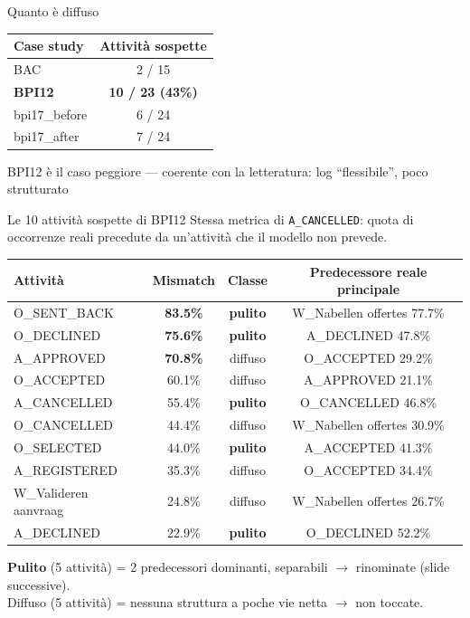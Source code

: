 \documentclass[11pt,aspectratio=169]{beamer}
\newcommand{\good}[1]{\textcolor{goodcol}{\textbf{#1}}}
\newcommand{\warncell}[1]{\textcolor{warncol}{\textbf{#1}}}
\begin{document}
\begin{frame}{Quanto \`e diffuso}
\begin{center}
\begin{tabular}{lc}
\toprule
\textbf{Case study} & \textbf{Attivit\`a sospette} \\
\midrule
BAC & 2 / 15 \\
\textbf{BPI12} & \warncell{10 / 23 (43\%)} \\
bpi17\_before & 6 / 24 \\
bpi17\_after & 7 / 24 \\
\bottomrule
\end{tabular}
\end{center}
\vspace{1em}
\centering BPI12 \`e il caso peggiore --- coerente con la letteratura: log ``flessibile'', poco strutturato
\end{frame}

\begin{frame}{Le 10 attivit\`a sospette di BPI12}
{\small Stessa metrica di \texttt{A\_CANCELLED}: quota di occorrenze reali precedute da un'attivit\`a che il modello non prevede.}
\vspace{0.4em}
\centering
\scriptsize
\begin{tabular}{lccc}
\toprule
\textbf{Attivit\`a} & \textbf{Mismatch} & \textbf{Classe} & \textbf{Predecessore reale principale} \\
\midrule
O\_SENT\_BACK & \warncell{83.5\%} & \good{pulito} & W\_Nabellen offertes 77.7\% \\
O\_DECLINED & \warncell{75.6\%} & \good{pulito} & A\_DECLINED 47.8\% \\
A\_APPROVED & \warncell{70.8\%} & diffuso & O\_ACCEPTED 29.2\% \\
O\_ACCEPTED & 60.1\% & diffuso & A\_APPROVED 21.1\% \\
A\_CANCELLED & 55.4\% & \good{pulito} & O\_CANCELLED 46.8\% \\
O\_CANCELLED & 44.4\% & diffuso & W\_Nabellen offertes 30.9\% \\
O\_SELECTED & 44.0\% & \good{pulito} & A\_ACCEPTED 41.3\% \\
A\_REGISTERED & 35.3\% & diffuso & O\_ACCEPTED 34.4\% \\
W\_Valideren aanvraag & 24.8\% & diffuso & W\_Nabellen offertes 26.7\% \\
A\_DECLINED & 22.9\% & \good{pulito} & O\_DECLINED 52.2\% \\
\bottomrule
\end{tabular}
\vspace{0.6em}

{\small \good{Pulito} (5 attivit\`a) = 2 predecessori dominanti, separabili $\to$ rinominate (slide successive). \\
Diffuso (5 attivit\`a) = nessuna struttura a poche vie netta $\to$ non toccate.}
\end{frame}
\end{document}

